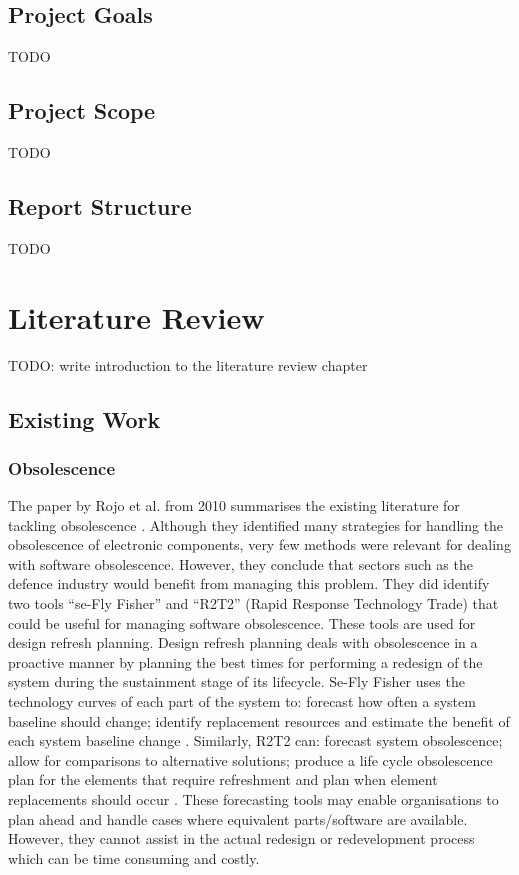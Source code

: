 \documentclass{UoYCSproject}
\begin{document}
\section{Project Goals}
TODO
\section{Project Scope}
TODO
\section{Report Structure}
TODO

\chapter{Literature Review}
TODO: write introduction to the literature review chapter
\section{Existing Work}
\subsection{Obsolescence}
The paper by Rojo et al. from 2010 summarises the existing literature for tackling obsolescence \parencite{rojo2010obsolescence}. Although they identified many strategies for handling the obsolescence of electronic components, very few methods were relevant for dealing with software obsolescence. However, they conclude that sectors such as the defence industry would benefit from managing this problem.
\newline
They did identify two tools ``se-Fly Fisher'' and ``R2T2'' (Rapid Response Technology Trade) that could be useful for managing software obsolescence. These tools are used for design refresh planning. Design refresh planning deals with obsolescence in a proactive manner by planning the best times for performing a redesign of the system during the sustainment stage of its lifecycle. 
\newline
Se-Fly Fisher uses the technology curves of each part of the system to: forecast how often a system baseline should change; identify replacement resources and estimate the benefit of each system baseline change \parencite{rojo2010obsolescence}.
Similarly, R2T2 can: forecast system obsolescence; allow for comparisons to alternative solutions; produce a life cycle obsolescence plan for the elements that require refreshment and plan when element replacements should occur \parencite{herald2009obsolescence}.
These forecasting tools may enable organisations to plan ahead and handle cases where equivalent parts/software are available. However, they cannot assist in the actual redesign or redevelopment process which can be time consuming and costly.
\end{document}
